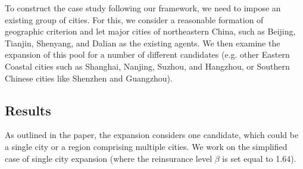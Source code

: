 \documentclass[fleqn,mnsc,nonblindrev]{informs4}
\begin{document}
To construct the case study following our framework, we need to impose an existing group of cities. For this, we consider a reasonable formation of geographic criterion and let major cities of northeastern China, such as Beijing, Tianjin, Shenyang, and Dalian as the existing agents. We then examine the expansion of this pool for a number of different candidates (e.g. other Eastern Coastal cities such as Shanghai, Nanjing, Suzhou, and Hangzhou, or Southern Chinese cities like Shenzhen and Guangzhou). 

\subsection{Results}
As outlined in the paper, the expansion considers one candidate, which could be a single city or a region comprising multiple cities. We work on the simplified case of single city expansion (where the reinsurance level $\beta$ is set equal to 1.64).
\end{document}
